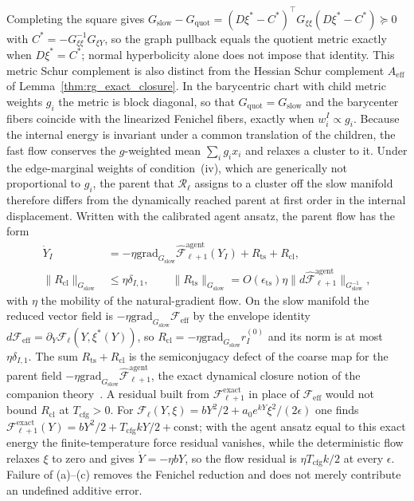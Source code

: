 Completing the square gives $G_{\mathrm{slow}}-G_{\mathrm{quot}}=(D\xi^*-C^*)^\top G_{\xi\xi}(D\xi^*-C^*)\succeq0$ with $C^*=-G_{\xi\xi}^{-1}G_{\xi Y}$, so the graph pullback equals the quotient metric exactly when $D\xi^*=C^*$; normal hyperbolicity alone does not impose that identity. This metric Schur complement is also distinct from the Hessian Schur complement $A_{\mathrm{eff}}$ of Lemma~\ref{thm:rg_exact_closure}. In the barycentric chart with child metric weights $g_i$ the metric is block diagonal, so that $G_{\mathrm{quot}}=G_{\mathrm{slow}}$ and the barycenter fibers coincide with the linearized Fenichel fibers, exactly when $w_i^I\propto g_i$. Because the internal energy is invariant under a common translation of the children, the fast flow conserves the $g$-weighted mean $\sum_ig_ix_i$ and relaxes a cluster to it. Under the edge-marginal weights of condition~(iv), which are generically not proportional to $g_i$, the parent that $\mathcal{R}_\ell$ assigns to a cluster off the slow manifold therefore differs from the dynamically reached parent at first order in the internal displacement. Written with the calibrated agent ansatz, the parent flow has the form
\begin{align}
\dot{Y}_I
 &= -\eta\mathrm{grad}_{G_{\mathrm{slow}}}\widehat{\mathcal{F}}^{\mathrm{agent}}_{\ell+1}(Y_I)+R_{\mathrm{ts}}+R_{\mathrm{cl}}, \nonumber\\
\|R_{\mathrm{cl}}\|_{G_{\mathrm{slow}}}
 &\leq \eta\delta_{I,1}, \qquad
\|R_{\mathrm{ts}}\|_{G_{\mathrm{slow}}}=O(\epsilon_{\mathrm{ts}})\eta\|d\widehat{\mathcal{F}}^{\mathrm{agent}}_{\ell+1}\|_{G_{\mathrm{slow}}^{-1}},
\label{eq:rg_schur_flow}
\end{align}
with $\eta$ the mobility of the natural-gradient flow. On the slow manifold the reduced vector field is $-\eta\mathrm{grad}_{G_{\mathrm{slow}}}\mathcal{F}_{\mathrm{eff}}$ by the envelope identity $d\mathcal{F}_{\mathrm{eff}}=\partial_Y\mathcal{F}_\ell(Y,\xi^*(Y))$, so $R_{\mathrm{cl}}=-\eta\mathrm{grad}_{G_{\mathrm{slow}}}r_I^{(0)}$ and its norm is at most $\eta\delta_{I,1}$. The sum $R_{\mathrm{ts}}+R_{\mathrm{cl}}$ is the semiconjugacy defect of the coarse map for the parent field $-\eta\mathrm{grad}_{G_{\mathrm{slow}}}\widehat{\mathcal{F}}^{\mathrm{agent}}_{\ell+1}$, the exact dynamical closure notion of the companion theory~\cite[Ch.~11]{DennisGaugeVFE2026}. A residual built from $\mathcal{F}^{\mathrm{exact}}_{\ell+1}$ in place of $\mathcal{F}_{\mathrm{eff}}$ would not bound $R_{\mathrm{cl}}$ at $T_{\mathrm{cfg}}>0$. For $\mathcal{F}_\ell(Y,\xi)=bY^2/2+a_0e^{kY}\xi^2/(2\epsilon)$ one finds $\mathcal{F}^{\mathrm{exact}}_{\ell+1}(Y)=bY^2/2+T_{\mathrm{cfg}}kY/2+\mathrm{const}$; with the agent ansatz equal to this exact energy the finite-temperature force residual vanishes, while the deterministic flow relaxes $\xi$ to zero and gives $\dot Y=-\eta bY$, so the flow residual is $\eta T_{\mathrm{cfg}}k/2$ at every $\epsilon$. Failure of (a)--(c) removes the Fenichel reduction and does not merely contribute an undefined additive error.


